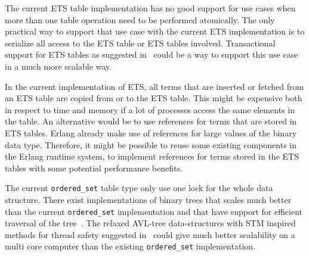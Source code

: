 \documentclass[aps,pre,preprint,nofootinbib]{revtex4}
\begin{document}
  The current ETS table implementation has no good support for use cases when more than one table operation need to be performed atomically.
  The only practical way to support that use case with the current ETS implementation is to serialize all access to the ETS table or ETS tables involved.
  Transactional support for ETS tables as suggested in~\cite{PatrikErlangTrans} could be a way to support this use case in a much more scalable way.
  
  In the current implementation of ETS, all terms that are inserted or fetched from an ETS table are copied from or to the ETS table.
  This might be expensive both in respect to time and memory if a lot of processes access the same elements in the table.
  An alternative would be to use references for terms that are stored in ETS tables. 
  Erlang already make use of references for large values of the binary data type.
  Therefore, it might be possible to reuse some existing components in the Erlang runtime system, to implement references for terms stored in the ETS tables with some potential performance benefits.
  
  The current \verb|ordered_set| table type only use one lock for the whole data structure.
  There exist implementations of binary trees that scales much better than the current \verb|ordered_set| implementation and that have support for efficient traversal of the tree~\cite{BronsonPracTree}.
  The relaxed AVL-tree data-structures with STM inspired methods for thread safety suggested in~\cite{BronsonPracTree} could give much better scalability on a multi core computer than the existing \verb|ordered_set| implementation.
  

  


  
\end{document}
